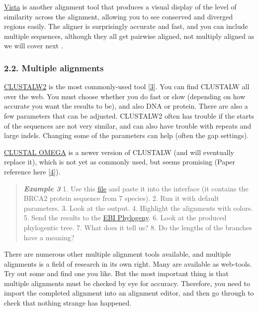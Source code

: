 \documentclass[]{article}
\begin{document}
\href{http://genome.lbl.gov/vista/index.shtml}{Vista} is another
alignment tool that produces a visual display of the level of similarity
across the alignment, allowing you to see conserved and diverged regions
easily. The aligner is surprisingly accurate and fast, and you can
include multiple sequences, although they all get pairwise aligned, not
multiply aligned as we will cover next .

\subsubsection{2.2. Multiple alignments}\label{multiple-alignments}

\href{https://www.ebi.ac.uk/Tools/msa/clustalw2/}{CLUSTALW2} is the most
commonly-used tool
{[}\href{http://www.ncbi.nlm.nih.gov/pubmed/17846036}{3}{]}. You can
find CLUSTALW all over the web. You must choose whether you do fast or
slow (depending on how accurate you want the results to be), and also
DNA or protein. There are also a few parameters that can be adjusted.
CLUSTALW2 often has trouble if the starts of the sequences are not very
similar, and can also have trouble with repeats and large indels.
Changing some of the parameters can help (often the gap settings).

\href{https://www.ebi.ac.uk/Tools/msa/clustalo/}{CLUSTAL OMEGA} is a
newer version of CLUSTALW (and will eventually replace it), which is not
yet as commonly used, but seems promising (Paper reference here
{[}\href{http://msb.embopress.org/content/7/1/539}{4}{]}).

\begin{quote}
\emph{\textbf{Example 3}} 1. Use this
\href{http://compbio.massey.ac.nz/wiki/data/c1/BRCA2_aa.fasta}{file} and
paste it into the interface (it contains the BRCA2 protein sequence from
7 species). 2. Run it with default parameters. 3. Look at the output. 4.
Highlight the alignments with colors. 5. Send the results to the
\href{https://www.ebi.ac.uk/Tools/phylogeny/clustalw2_phylogeny/}{EBI
Phylogeny}. 6. Look at the produced phylogentic tree. 7. What does it
tell us? 8. Do the lengths of the branches have a meaning?
\end{quote}

There are numerous other multiple alignment tools available, and
multiple alignments is a field of research in its own right. Many are
available as web-tools. Try out some and find one you like. But the most
important thing is that multiple alignments must be checked by eye for
accuracy. Therefore, you need to import the completed alignment into an
alignment editor, and then go through to check that nothing strange has
happened.
\end{document}
